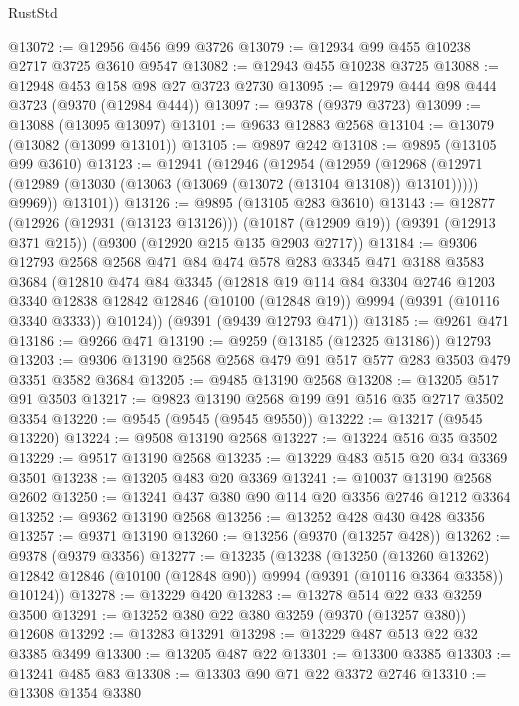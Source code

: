 \begin{lexlean}{RustStd}
\begin{coremodule}
@13072 := @12956 @456 @99 @3726
@13079 := @12934 @99 @455 @10238 @2717 @3725 @3610 @9547
@13082 := @12943 @455 @10238 @3725
@13088 := @12948 @453 @158 @98 @27 @3723 @2730
@13095 := @12979 @444 @98 @444 @3723 (@9370 (@12984 @444))
@13097 := @9378 (@9379 @3723)
@13099 := @13088 (@13095 @13097)
@13101 := @9633 @12883 @2568
@13104 := @13079 (@13082 (@13099 @13101))
@13105 := @9897 @242
@13108 := @9895 (@13105 @99 @3610)
@13123 := @12941
    (@12946
      (@12954
        (@12959
          (@12968
            (@12971 (@12989 (@13030 (@13063 (@13069 (@13072 (@13104 @13108)) @13101)))))
            @9969))
        @13101))
@13126 := @9895 (@13105 @283 @3610)
@13143 := @12877
    (@12926 (@12931 (@13123 @13126)))
    (@10187 (@12909 @19))
    (@9391 (@12913 @371 @215))
    (@9300 (@12920 @215 @135 @2903 @2717))
@13184 := @9306
    @12793
    @2568
    @2568
    @471
    @84
    @474
    @578
    @283
    @3345
    @471
    @3188
    @3583
    @3684
    (@12810
      @474
      @84
      @3345
      (@12818
        @19
        @114
        @84
        @3304
        @2746
        @1203
        @3340
        @12838
        @12842
        @12846
        (@10100 (@12848 @19))
        @9994
        (@9391 (@10116 @3340 @3333))
        @10124))
    (@9391 (@9439 @12793 @471))
@13185 := @9261 @471
@13186 := @9266 @471
@13190 := @9259 (@13185 (@12325 @13186)) @12793
@13203 := @9306 @13190 @2568 @2568 @479 @91 @517 @577 @283 @3503 @479 @3351 @3582 @3684
@13205 := @9485 @13190 @2568
@13208 := @13205 @517 @91 @3503
@13217 := @9823 @13190 @2568 @199 @91 @516 @35 @2717 @3502 @3354
@13220 := @9545 (@9545 (@9545 @9550))
@13222 := @13217 (@9545 @13220)
@13224 := @9508 @13190 @2568
@13227 := @13224 @516 @35 @3502
@13229 := @9517 @13190 @2568
@13235 := @13229 @483 @515 @20 @34 @3369 @3501
@13238 := @13205 @483 @20 @3369
@13241 := @10037 @13190 @2568 @2602
@13250 := @13241 @437 @380 @90 @114 @20 @3356 @2746 @1212 @3364
@13252 := @9362 @13190 @2568
@13256 := @13252 @428 @430 @428 @3356
@13257 := @9371 @13190
@13260 := @13256 (@9370 (@13257 @428))
@13262 := @9378 (@9379 @3356)
@13277 := @13235
    (@13238
      (@13250
        (@13260 @13262)
        @12842
        @12846
        (@10100 (@12848 @90))
        @9994
        (@9391 (@10116 @3364 @3358))
        @10124))
@13278 := @13229 @420
@13283 := @13278 @514 @22 @33 @3259 @3500
@13291 := @13252 @380 @22 @380 @3259 (@9370 (@13257 @380)) @12608
@13292 := @13283 @13291
@13298 := @13229 @487 @513 @22 @32 @3385 @3499
@13300 := @13205 @487 @22
@13301 := @13300 @3385
@13303 := @13241 @485 @83
@13308 := @13303 @90 @71 @22 @3372 @2746
@13310 := @13308 @1354 @3380

\end{coremodule}
\end{lexlean}
